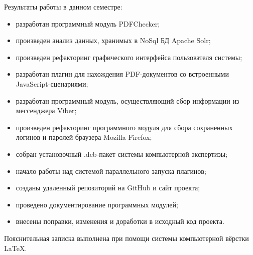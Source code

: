 Результаты работы в данном семестре:

\begin{itemize}
  \item разработан программный модуль PDFChecker;
  \item произведен анализ данных, хранимых в NoSql БД Apache Solr; 
  \item произведен рефакторинг графического интерфейса пользователя системы;
  \item разработан плагин для нахождения PDF-документов со встроенными JavaScript-сценариями;
  \item разработан программный модуль, осуществляющий сбор информации из мессенджера Viber;  
  \item произведен рефакторинг программного модуля для сбора сохраненных логинов и паролей браузера Mozilla Firefox;  
  \item собран установочный .deb-пакет системы компьютерной экспертизы;  
  \item начало работы над системой параллельного запуска плагинов; 
  \item созданы удаленный репозиторий на GitHub и сайт проекта;  
  \item проведено документирование программных модулей;
  \item внесены поправки, изменения и доработки в исходный код проекта.
\end{itemize}

Пояснительная записка выполнена при помощи системы компьютерной вёрстки \LaTeX.
